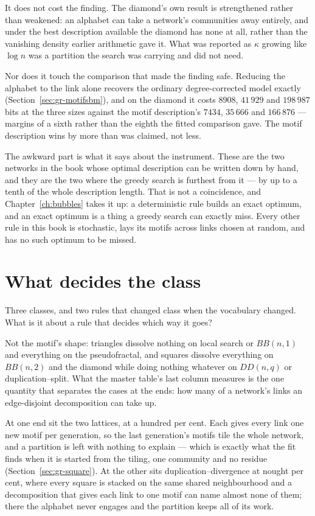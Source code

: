 It does not cost the finding. The diamond's own result is strengthened rather
than weakened: an alphabet can take a network's communities away entirely, and
under the best description available the diamond has none at all, rather than the
vanishing density earlier arithmetic gave it. What was reported as $\kappa$
growing like $\log n$ was a partition the search was carrying and did not need.

Nor does it touch the comparison that made the finding safe. Reducing the
alphabet to the link alone recovers the ordinary degree-corrected model exactly
(Section~\ref{sec:gr-motifsbm}), and on the diamond it costs $8908$, $41\,929$
and $198\,987$ bits at the three sizes against the motif description's $7434$,
$35\,666$ and $166\,876$ --- margins of a sixth rather than the eighth the fitted
comparison gave. The motif description wins by more than was claimed, not less.

The awkward part is what it says about the instrument. These are the two networks
in the book whose optimal description can be written down by hand, and they are
the two where the greedy search is furthest from it --- by up to a tenth of the
whole description length. That is not a coincidence, and
Chapter~\ref{ch:bubbles} takes it up: a deterministic rule builds an exact
optimum, and an exact optimum is a thing a greedy search can exactly miss. Every
other rule in this book is stochastic, lays its motifs across links chosen at
random, and has no such optimum to be missed.

\section{What decides the class}
\label{sec:gr-decides}

Three classes, and two rules that changed class when the vocabulary changed. What
is it about a rule that decides which way it goes?

Not the motif's shape: triangles dissolve nothing on local search or $BB(n,1)$
and everything on the pseudofractal, and squares dissolve everything on
$BB(n,2)$ and the diamond while doing nothing whatever on $DD(n,q)$ or
duplication--split. What the master table's last column measures is the one
quantity that separates the cases at the ends: how many of a network's links an
edge-disjoint decomposition can take up.

At one end sit the two lattices, at a hundred per cent. Each gives every link one
new motif per generation, so the last generation's motifs tile the whole network,
and a partition is left with nothing to explain --- which is exactly what the fit
finds when it is started from the tiling, one community and no residue
(Section~\ref{sec:gr-square}). At the other sits duplication--divergence at
nought per cent, where every square is stacked on the same shared neighbourhood
and a decomposition that gives each link to one motif can name almost none of
them; there the alphabet never engages and the partition keeps all of its work.

